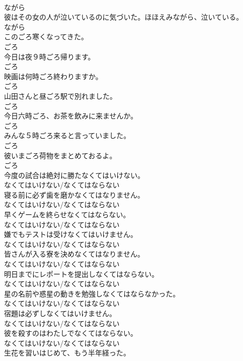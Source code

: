 \documentclass[8pt]{extreport}
\begin{document}
\begin{CJK}{UTF8}{min}
\\	ながら
\\	彼はその女の人が泣いているのに気づいた。ほほえみながら、泣いている。	
\\	ながら
\\	このごろ寒くなってきた。	
\\	ごろ
\\	今日は夜９時ごろ帰ります。	
\\	ごろ
\\	映画は何時ごろ終わりますか。	
\\	ごろ
\\	山田さんと昼ごろ駅で別れました。	
\\	ごろ
\\	今日六時ごろ、お茶を飲みに来ませんか。	
\\	ごろ
\\	みんな５時ごろ来ると言っていました。	
\\	ごろ
\\	彼いまごろ荷物をまとめておるよ。	
\\	ごろ
\\	今度の試合は絶対に勝たなくてはいけない。	
\\	なくてはいけない/なくてはならない
\\	寝る前に必ず歯を磨かなくてはなりません。	
\\	なくてはいけない/なくてはならない
\\	早くゲームを終らせなくてはならない。	
\\	なくてはいけない/なくてはならない
\\	嫌でもテストは受けなくてはいけません。	
\\	なくてはいけない/なくてはならない
\\	皆さんが入る寮を決めなくてはなりません。	
\\	なくてはいけない/なくてはならない
\\	明日までにレポートを提出しなくてはならない。	
\\	なくてはいけない/なくてはならない
\\	星の名前や惑星の動きを勉強しなくてはならなかった。	
\\	なくてはいけない/なくてはならない
\\	宿題は必ずしなくてはいけません。	
\\	なくてはいけない/なくてはならない
\\	彼を殺すのはわたしでなくてはならない。	
\\	なくてはいけない/なくてはならない
\\	生花を習いはじめて、もう半年経った。	

\end{CJK}
\end{document}

